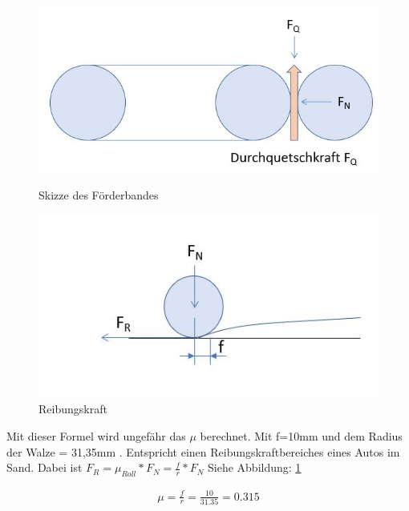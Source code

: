 \begin{figure}[H]
   \begin{minipage}[hbt]{.4\linewidth} %
      \includegraphics[width=\linewidth]{Bilder/Powerpoint/Foerderband_Skizze}
      \caption{Skizze des Förderbandes}
      \label{SkizzeFoerderband} 
   \end{minipage}
   \hspace{.2\linewidth}%
   \begin{minipage}[hbt]{.4\linewidth} %
      \includegraphics[width=\linewidth]{Bilder/Powerpoint/Reibung}
      \caption{Reibungskraft}
      \label{SkizzeReibung}
   \end{minipage}
\end{figure}

Mit dieser Formel wird ungefähr das $\mu$ berechnet. Mit f=10mm und dem Radius der Walze = 31,35mm . Entspricht einen Reibungskraftbereiches eines Autos im Sand. Dabei ist $F_R = \mu_{Roll} * F_N = \frac{f}{r} * F_N$ Siehe Abbildung: \ref{SkizzeReibung}

\begin{align*}
\mu = \frac{f}{r} = \frac{10}{31.35} = 0.315
\end{align*}

